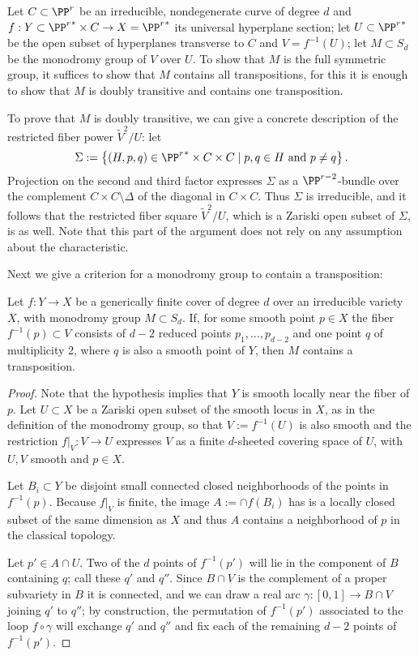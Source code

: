 Let $C \subset \PP^r$ be an irreducible, nondegenerate curve of degree $d$ and $f : Y \subset {\PP^r}^* \times C \to  X = {\PP^r}^*$ its universal hyperplane section; let $U \subset {\PP^r}^*$ be the open subset of hyperplanes transverse to $C$ and $V = f^{-1}(U)$; let $M \subset S_d$ be the monodromy group of $V$ over $U$.
To show that  $M$ is the full symmetric group, it suffices to show that $M$ contains all transpositions, for this it is enough to show that $M$ is doubly transitive and contains one transposition.

To prove that $M$ is doubly transitive, we can give a concrete description of the restricted fiber power $\tilde V^2/U$: let
$$
\Sigma := \left\{ (H, p, q) \in {\PP^r}^* \times C \times C \mid p, q \in H \text{ and } p \neq q \right\}.
$$
Projection on the second and third factor expresses $\Sigma$ as a $\PP^{r-2}$-bundle over the complement $C \times C \setminus \Delta$ of the diagonal in $C \times C$. Thus $\Sigma$ is irreducible, and it follows that the restricted fiber square $\tilde V^2/U$, which is a Zariski open subset of $\Sigma$, is as well. Note that this part of the argument does not rely on any assumption about the characteristic.

Next we give a criterion for a monodromy group to contain a transposition:

\begin{lemma}\label{transposition lemma}
Let $f : Y \to X$ be a generically finite cover of degree $d$ over an irreducible variety $X$, with  monodromy group $M \subset S_d$.  
If,  for some smooth point $p \in X$ the fiber $f^{-1}(p)\subset V$ consists of $d-2$ reduced points $p_1,\dots, p_{d-2}$ and one point $q$ of multiplicity 2, where $q$ is also a smooth point of $Y$, then $M$ contains a transposition.
\end{lemma}

\begin{proof} Note that the hypothesis implies that $Y$ is smooth
locally near the fiber of $p$. Let $U \subset X$ be a Zariski open subset of the smooth locus in $X$, as in the definition of the monodromy group, so that  $V := f^{-1}(U)$ is also smooth and the restriction $f|_V : V \to U$ expresses $V$ as a finite $d$-sheeted covering space of $U$, with $U,V$ smooth and $p\in X$.

Let $B_i\subset Y$ be disjoint small connected closed neighborhoods of the points
in $f^{-1}(p)$. Because $f|_V$  is finite, the image $A := \cap f(B_i)$ has is a locally
closed subset of the same dimension as $X$ and thus $A$
 contains a neighborhood
of $p$ in the classical topology.

Let $p' \in A \cap U$. Two of the $d$ points of $f^{-1}(p')$ will lie in the component  of $B$ containing $q$; call these $q'$ and $q''$. Since $B \cap V$ is the complement of a proper subvariety in $B$ it is connected, and we can draw a real arc $\gamma : [0,1] \to B \cap V$ joining $q'$ to $q''$; by construction, the permutation of $f^{-1}(p')$ associated to the loop $f \circ \gamma$ will exchange $q'$ and $q''$ and fix each of the remaining $d-2$ points of $f^{-1}(p')$.
\end{proof}

